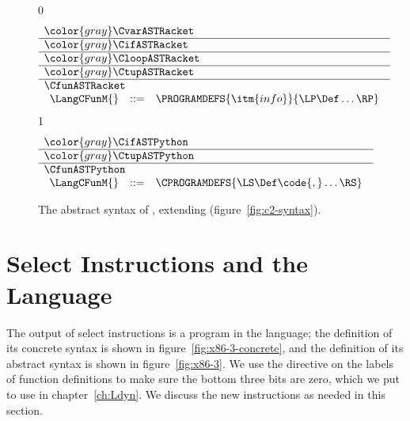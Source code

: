 \documentclass[7x10]{TimesAPriori_MIT}%
\newcommand{\gray}[1]{{\color{gray} #1}}
\def\racketEd{0}
\def\pythonEd{1}
\def\edition{1}
\newcommand{\pythonColor}[0]{}
\numberwithin{theorem}{chapter}
\numberwithin{definition}{chapter}
\numberwithin{equation}{chapter}
\begin{document}
\begin{figure}[tp]
  \begin{tcolorbox}[colback=white]
\footnotesize
{\if\edition\racketEd
\[
\begin{array}{l}
  \gray{\CvarASTRacket} \\ \hline
  \gray{\CifASTRacket} \\ \hline
  \gray{\CloopASTRacket} \\ \hline
  \gray{\CtupASTRacket} \\ \hline
  \CfunASTRacket \\
  \begin{array}{lcl}
  \LangCFunM{} & ::= & \PROGRAMDEFS{\itm{info}}{\LP\Def\ldots\RP} 
  \end{array}
\end{array}
\]
\fi}
{\if\edition\pythonEd\pythonColor
\[
  \begin{array}{l}
  \gray{\CifASTPython} \\ \hline
  \gray{\CtupASTPython} \\ \hline
  \CfunASTPython \\
  \begin{array}{lcl}
    \LangCFunM{} & ::= & \CPROGRAMDEFS{\LS\Def\code{,}\ldots\RS} 
  \end{array}
  \end{array}
\]
\fi}
  \end{tcolorbox}

\caption{The abstract syntax of \LangCFun{}, extending \LangCVec{} (figure~\ref{fig:c2-syntax}).}
\label{fig:c3-syntax}
\end{figure}

\clearpage

\section{Select Instructions and the \LangXIndCall{} Language}
\label{sec:select-r4}

The output of select instructions is a program in the \LangXIndCall{}
language; the definition of its concrete syntax is shown in
figure~\ref{fig:x86-3-concrete}, and the definition of its abstract
syntax is shown in figure~\ref{fig:x86-3}.  We use the 
directive on the labels of function definitions to make sure the
bottom three bits are zero, which we put to use in
chapter~\ref{ch:Ldyn}. We discuss the new instructions as needed in
this section.  

\newcommand{\GrammarXIndCall}{
\begin{array}{lcl}
\Instr &::=&  \key{callq}\;\key{*}\Arg \MID \key{tailjmp}\;\Arg 
     \MID \key{leaq}\;\Arg\key{,}\;\key{\%}\Reg \\
\Block &::= & \Instr^{+} \\
\Def &::= & \code{.globl}\,\code{.align 8}\,\itm{label}\; (\itm{label}\key{:}\, \Block)^{*} 
\end{array}
}
\end{document}
